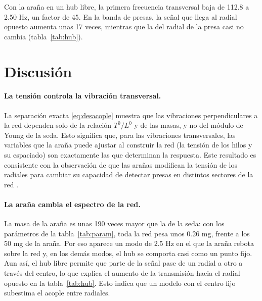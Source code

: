\documentclass[11pt,letterpaper]{article}
\begin{document}
Con la araña en un hub libre, la primera frecuencia transversal baja de
112.8 a 2.50 Hz, un factor de 45. En la banda de presas, la señal que llega
al radial opuesto aumenta unas 17 veces, mientras que la del radial de la
presa casi no cambia (tabla~\ref{tab:hub}).

\section{Discusión}\label{sec:discusion}

\paragraph{La tensión controla la vibración transversal.} La separación
exacta \eqref{eq:desacople} muestra que las vibraciones perpendiculares a la
red dependen solo de la relación $T^0/L^0$ y de las masas, y no del módulo de
Young de la seda. Esto significa que, para las vibraciones transversales,
las variables que la araña puede ajustar al construir la red (la tensión de
los hilos y su espaciado) son exactamente las que determinan la respuesta.
Este resultado es consistente con la observación de que las arañas modifican
la tensión de los radiales para cambiar su capacidad de detectar presas en
distintos sectores de la red \cite{nakata2010}.

\paragraph{La araña cambia el espectro de la red.} La masa de la araña es
unas 190 veces mayor que la de la seda: con los parámetros de la
tabla~\ref{tab:param}, toda la red pesa unos 0.26 mg, frente a los 50 mg de
la araña. Por eso aparece un modo de 2.5 Hz en el que
la araña rebota sobre la red y, en los demás modos, el hub se comporta casi
como un punto fijo. Aun así, el hub libre permite que parte de la señal pase
de un radial a otro a través del centro, lo que explica el aumento de la
transmisión hacia el radial opuesto en la tabla~\ref{tab:hub}. Esto indica
que un modelo con el centro fijo subestima el acople entre radiales.
\end{document}
